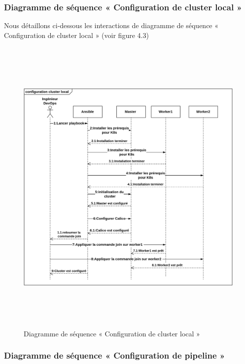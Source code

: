                 \subsubsection{\selectfont\Large Diagramme de séquence « Configuration de cluster local » }
                \textsf{Nous détaillons ci-dessous les interactions de diagramme de séquence « Configuration de cluster local » (voir figure 4.3) }
                \begin{figure}[H]
                    \begin{center}
                    \includegraphics[height=15cm,width=18cm]{SEQCLUSTER.png}
                    \end{center}
                    \caption{Diagramme de séquence « Configuration de cluster local »}
                    \end{figure}\subsubsection{\selectfont\Large Diagramme de séquence « Configuration de pipeline » }
